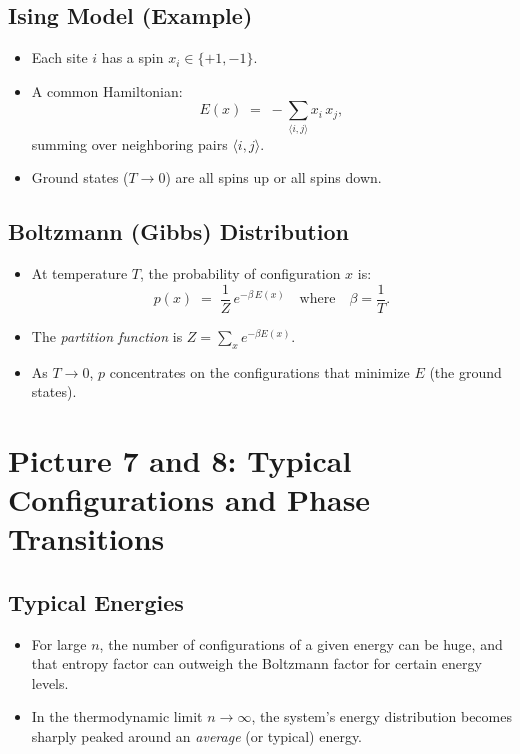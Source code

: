 \documentclass{article}%
\begin{document}
\subsection*{Ising Model (Example)}
\begin{itemize}
    \item Each site \(i\) has a spin \(x_i \in \{+1,-1\}\).
    \item A common Hamiltonian:
    \[
        E(x) \;=\; -\sum_{\langle i,j\rangle} x_i \, x_j,
    \]
    summing over neighboring pairs \(\langle i,j\rangle\).
    \item Ground states (\(T \to 0\)) are all spins up or all spins down.
\end{itemize}

\subsection*{Boltzmann (Gibbs) Distribution}
\begin{itemize}
    \item At temperature \(T\), the probability of configuration \(x\) is:
    \[
        p(x) \;=\; \frac{1}{Z} \, e^{-\beta \, E(x)} \quad\text{where}\quad \beta = \frac{1}{T}.
    \]
    \item The \emph{partition function} is \(Z = \sum_{x} e^{-\beta E(x)}\).
    \item As \(T\to 0\), \(p\) concentrates on the configurations that minimize \(E\) (the ground states).
\end{itemize}

\section{Picture 7 and 8: Typical Configurations and Phase Transitions}

\subsection*{Typical Energies}
\begin{itemize}
    \item For large \(n\), the number of configurations of a given energy can be huge, and that entropy factor can outweigh the Boltzmann factor for certain energy levels.
    \item In the thermodynamic limit \(n \to \infty\), the system’s energy distribution becomes sharply peaked around an \emph{average} (or typical) energy.
\end{itemize}
\end{document}
